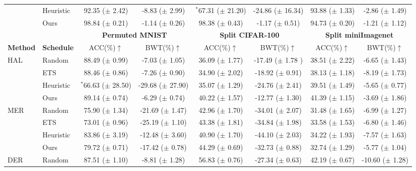 \begin{table}[t]
{\begin{tabular}{l l c c c c c c}
         & Heuristic & 92.35 ($\pm$ 2.42) & -8.83 ($\pm$ 2.99) & $^{*}$67.31 ($\pm$ 21.20) & -24.86 ($\pm$ 16.34) & 93.88 ($\pm$ 1.33) & -2.86 ($\pm$ 1.49) \\
         & Ours & 98.84 ($\pm$ 0.21)  & -1.14 ($\pm$ 0.26)  & 98.38 ($\pm$ 0.43) & -1.17 ($\pm$ 0.51) & 94.73 ($\pm$ 0.20) & -1.21 ($\pm$ 1.12) \\
        \bottomrule
        \toprule
         & & \multicolumn{2}{c}{{\bf Permuted MNIST} } & \multicolumn{2}{c}{{\bf Split CIFAR-100} } & \multicolumn{2}{c}{{\bf Split miniImagenet} } \\
         \cmidrule{3-4} \cmidrule{5-6} \cmidrule{7-8} %
         {\bf Method} & {\bf Schedule} & ACC(\%)$\uparrow$ & BWT(\%)$\uparrow$ & ACC(\%)$\uparrow$ & BWT(\%)$\uparrow$ & ACC(\%)$\uparrow$ & BWT(\%)$\uparrow$ \\
        \midrule 
        \multirow{4}{*}{HAL} & Random & 88.49 ($\pm$ 0.99) & -7.03 ($\pm$ 1.05) & 36.09 ($\pm$ 1.77) & -17.49 ($\pm$ 1.78 ) & 38.51 ($\pm$ 2.22) & -6.65 ($\pm$ 1.43) \\
         & ETS & 88.46 ($\pm$ 0.86) & -7.26 ($\pm$ 0.90) & 34.90 ($\pm$ 2.02) & -18.92 ($\pm$ 0.91) & 38.13 ($\pm$ 1.18) & -8.19 ($\pm$ 1.73) \\
         & Heuristic & $^{*}$66.63 ($\pm$ 28.50) & -29.68 ($\pm$ 27.90) & 35.07 ($\pm$ 1.29) & -24.76 ($\pm$ 2.41) & 39.51 ($\pm$ 1.49) & -5.65 ($\pm$ 0.77) \\
         & Ours & 89.14 ($\pm$ 0.74) & -6.29 ($\pm$ 0.74) & 40.22 ($\pm$ 1.57) & -12.77 ($\pm$ 1.30) & 41.39 ($\pm$ 1.15) & -3.69 ($\pm$ 1.86) \\
        \midrule 
        \multirow{4}{*}{MER} & Random & 75.90 ($\pm$ 1.34) & -21.69 ($\pm$ 1.47) & 42.96 ($\pm$ 1.70) & -34.01 ($\pm$ 2.07) & 31.48 ($\pm$ 1.65) & -6.99 ($\pm$ 1.27) \\
         & ETS & 73.01 ($\pm$ 0.96) & -25.19 ($\pm$ 1.10) & 43.38 ($\pm$ 1.81) & -34.84 ($\pm$ 1.98) & 33.58 ($\pm$ 1.53) & -6.80 ($\pm$ 1.46) \\
         & Heuristic & 83.86 ($\pm$ 3.19) & -12.48 ($\pm$ 3.60) & 40.90 ($\pm$ 1.70) & -44.10 ($\pm$ 2.03) & 34.22 ($\pm$ 1.93) & -7.57 ($\pm$ 1.63) \\
         & Ours & 79.72 ($\pm$ 0.71) & -17.42 ($\pm$ 0.78) & 44.29 ($\pm$ 0.69) & -32.73 ($\pm$ 0.88) & 32.74 ($\pm$ 1.29) & -5.77 ($\pm$ 1.04) \\
        \midrule 
        \multirow{4}{*}{DER} & Random & 87.51 ($\pm$ 1.10) & -8.81 ($\pm$ 1.28) & 56.83 ($\pm$ 0.76) & -27.34 ($\pm$ 0.63) & 42.19  ($\pm$ 0.67) & -10.60  ($\pm$ 1.28) \\

\end{tabular}}
\end{table}
